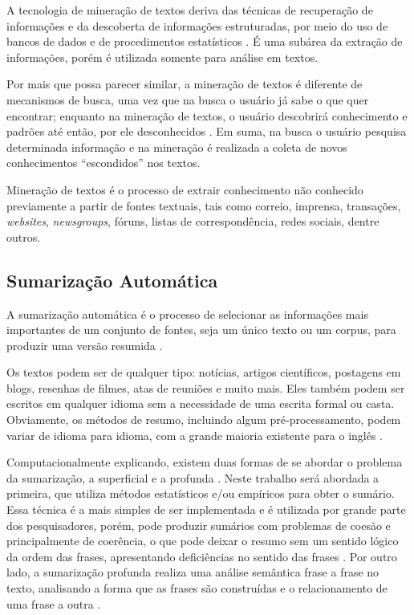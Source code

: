 A tecnologia de mineração de textos deriva das técnicas de recuperação de informações e da descoberta de informações estruturadas, por meio do uso de bancos de dados e de procedimentos estatísticos \cite{lima2022big}. É uma subárea da extração de informações, porém é utilizada somente para análise em textos.

Por mais que possa parecer similar, a mineração de textos é diferente de mecanismos de busca, uma vez que 
na busca o usuário já sabe o que quer encontrar; enquanto na mineração de textos, o usuário descobrirá conhecimento e padrões até então, por ele desconhecidos \cite{souza2021modelo}. Em suma, na busca o usuário pesquisa determinada informação e na mineração é realizada a coleta de novos conhecimentos “escondidos” nos textos.

Mineração de textos \cite{ferreira2021mineraccao} é o processo de extrair conhecimento não conhecido previamente a partir de fontes textuais, tais como correio, imprensa, transações, \textit{websites}, \textit{newsgroups}, fóruns, listas de correspondência, redes sociais, dentre outros.

\subsection{Sumarização Automática}
\label{sec:sumarizacao-automatica}
A sumarização automática é o processo de selecionar as informações mais importantes de um conjunto de
fontes, seja um único texto ou um corpus, para produzir uma versão resumida \cite{martins2001introduccao}.

Os textos podem ser de qualquer tipo: notícias, artigos científicos, postagens em blogs, resenhas de filmes, atas de reuniões e muito mais. Eles também podem ser escritos em qualquer idioma sem a necessidade de uma escrita formal ou casta. Obviamente, os métodos de resumo, incluindo algum pré-processamento, podem variar de idioma para idioma, com a grande maioria existente para o inglês \cite{cabral2014platform}.

Computacionalmente explicando, existem duas formas de se abordar o problema da sumarização, a superficial e
a profunda \cite{salvino2019analise}. Neste trabalho será abordada a primeira, que utiliza métodos 
estatísticos e/ou empíricos para obter o sumário. Essa técnica é a mais simples de ser implementada e é 
utilizada por grande parte dos pesquisadores, porém, pode produzir sumários com problemas de coesão e 
principalmente de coerência, o que pode deixar o resumo sem um sentido lógico da ordem das frases, 
apresentando deficiências no sentido das frases \cite{antunes2018abordagem}. Por outro lado, a sumarização profunda realiza uma análise semântica frase a frase no texto, analisando a forma que as frases são 
construídas e o relacionamento de uma frase a outra \cite{pinho2021analise}.

